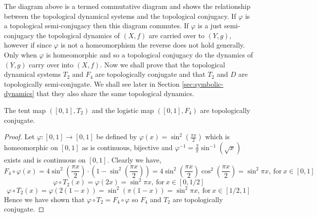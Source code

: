 \begin{center}
\end{center}

The diagram above is a termed commutative diagram and shows the relationship between the topological dynamical systems and the topological conjugacy. If $\varphi$ is a topological semi-conjugacy then this diagram commutes. If $\varphi$ is a just semi-conjugacy the topological dynamics of $(X, f)$ are carried over to $(Y, g)$, however if since $\varphi$ is not a homeomorphism the reverse does not hold generally. Only when $\varphi$ is homeomorphic and so a topological conjugacy do the dynamics of $(Y, g)$ carry over into $(X, f)$. Now we shall prove that the topological dynamical systems $T_2$ and $F_4$ are topologically conjugate and that $T_2$ and $D$ are topologically semi-conjugate. We shall see later in Section \ref{sec:symbolic-dynamics} that they also share the same topological dynamics.

\begin{prop} \label{prop:tent-logistic-conjugate}
    The tent map $([0, 1], T_2)$ and the logistic map $([0, 1], F_4)$ are topologically conjugate.
    \begin{proof}
        Let $\varphi: [0, 1] \to [0,1]$ be defined by $\varphi(x) = \sin^2(\frac{\pi x}{2})$ which is homeomorphic on $[0, 1]$ as is continuous, bijective and $\varphi^{-1} = \frac{2}{\pi} \sin^{-1}(\sqrt{x})$ exists and is continuous on $[0, 1]$. Clearly we have, \[F_4 \circ \varphi(x) = 4 \sin^2\left(\frac{\pi x}{2}\right) \cdot \left(1 - \sin^2\left(\frac{\pi x}{2}\right)\right) = 4 \sin^2\left(\frac{\pi x}{2}\right) \cos^2\left(\frac{\pi x}{2}\right) = \sin^2\pi x, \ \text{for} \ x \in [0, 1]\] \[\varphi \circ T_2(x) = \varphi(2x) = \sin^2\pi x, \ \text{for} \ x \in \left[0, 1/2\right]\] \[\varphi \circ T_2(x) = \varphi(2(1 - x)) = \sin^2 (\pi (1-x)) = \sin^2 \pi x, \ \text{for} \ x \in [1/2, 1]\] Hence we have shown that $\varphi \circ T_2 = F_4 \circ \varphi$ so $F_4$ and $T_2$ are topologically conjugate.
    \end{proof}
\end{prop}

